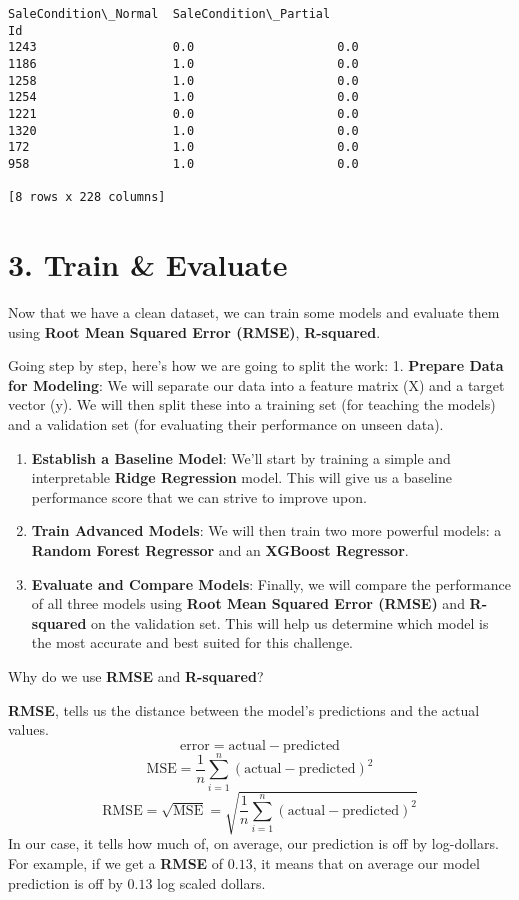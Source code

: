 \documentclass[11pt]{article}
\begin{document}
\begin{tcolorbox}[breakable, size=fbox, boxrule=.5pt, pad at break*=1mm, opacityfill=0]
\begin{Verbatim}[commandchars=\\\{\}]
      SaleCondition\_Normal  SaleCondition\_Partial
Id
1243                   0.0                    0.0
1186                   1.0                    0.0
1258                   1.0                    0.0
1254                   1.0                    0.0
1221                   0.0                    0.0
1320                   1.0                    0.0
172                    1.0                    0.0
958                    1.0                    0.0

[8 rows x 228 columns]
\end{Verbatim}
\end{tcolorbox}
        
    \section{3. Train \& Evaluate}\label{train-evaluate}

    Now that we have a clean dataset, we can train some models and evaluate
them using \textbf{Root Mean Squared Error (RMSE)}, \textbf{R-squared}.

Going step by step, here's how we are going to split the work: 1.
\textbf{Prepare Data for Modeling}: We will separate our data into a
feature matrix (X) and a target vector (y). We will then split these
into a training set (for teaching the models) and a validation set (for
evaluating their performance on unseen data).

\begin{enumerate}
\def\labelenumi{\arabic{enumi}.}
\setcounter{enumi}{1}
\item
  \textbf{Establish a Baseline Model}: We'll start by training a simple
  and interpretable \textbf{Ridge Regression} model. This will give us a
  baseline performance score that we can strive to improve upon.
\item
  \textbf{Train Advanced Models}: We will then train two more powerful
  models: a \textbf{Random Forest Regressor} and an \textbf{XGBoost
  Regressor}.
\item
  \textbf{Evaluate and Compare Models}: Finally, we will compare the
  performance of all three models using \textbf{Root Mean Squared Error
  (RMSE)} and \textbf{R-squared} on the validation set. This will help
  us determine which model is the most accurate and best suited for this
  challenge.
\end{enumerate}

Why do we use \textbf{RMSE} and \textbf{R-squared}?

\textbf{RMSE}, tells us the distance between the model's predictions and
the actual values. \[\mathrm{error}=\mathrm{actual}-\mathrm{predicted}\]
\[\mathrm{MSE}=\frac{1}{n}\sum_{i=1}^{n}(\mathrm{actual}-\mathrm{predicted})^2\]
\[\mathrm{RMSE}=\sqrt{\mathrm{MSE}}=\sqrt{\frac{1}{n}\sum_{i=1}^{n}(\mathrm{actual}-\mathrm{predicted})^2}\]
In our case, it tells how much of, on average, our prediction is off by
log-dollars. For example, if we get a \textbf{RMSE} of \(0.13\), it
means that on average our model prediction is off by \(0.13\) log scaled
dollars.
\end{document}
